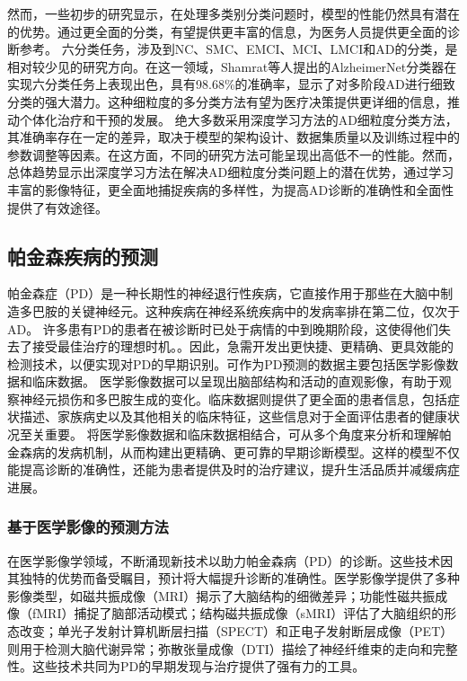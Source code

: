 然而，一些初步的研究显示，在处理多类别分类问题时，模型的性能仍然具有潜在的优势。通过更全面的分类，有望提供更丰富的信息，为医务人员提供更全面的诊断参考。
六分类任务，涉及到NC、SMC、EMCI、MCI、LMCI和AD的分类，是相对较少见的研究方向。在这一领域，Shamrat等人\cite{shamrat2023alzheimernet}提出的AlzheimerNet分类器在实现六分类任务上表现出色，具有98.68\%的准确率，显示了对多阶段AD进行细致分类的强大潜力。这种细粒度的多分类方法有望为医疗决策提供更详细的信息，推动个体化治疗和干预的发展。
绝大多数采用深度学习方法的AD细粒度分类方法，其准确率存在一定的差异，取决于模型的架构设计、数据集质量以及训练过程中的参数调整等因素。在这方面，不同的研究方法可能呈现出高低不一的性能。然而，总体趋势显示出深度学习方法在解决AD细粒度分类问题上的潜在优势，通过学习丰富的影像特征，更全面地捕捉疾病的多样性，为提高AD诊断的准确性和全面性提供了有效途径。


\subsection{帕金森疾病的预测}
帕金森症（PD）是一种长期性的神经退行性疾病，它直接作用于那些在大脑中制造多巴胺的关键神经元。这种疾病在神经系统疾病中的发病率排在第二位，仅次于AD\cite{prusiner2001neurodegenerative,leroy1998deletions}。
许多患有PD的患者在被诊断时已处于病情的中到晚期阶段，这使得他们失去了接受最佳治疗的理想时机。\cite{de2019prognosis,papagno2018cognitive}。因此，急需开发出更快捷、更精确、更具效能的检测技术，以便实现对PD的早期识别\cite{jyWen}。可作为PD预测的数据主要包括医学影像数据和临床数据。
医学影像数据可以呈现出脑部结构和活动的直观影像，有助于观察神经元损伤和多巴胺生成的变化。临床数据则提供了更全面的患者信息，包括症状描述、家族病史以及其他相关的临床特征，这些信息对于全面评估患者的健康状况至关重要。
将医学影像数据和临床数据相结合，可从多个角度来分析和理解帕金森病的发病机制，从而构建出更精确、更可靠的早期诊断模型。这样的模型不仅能提高诊断的准确性，还能为患者提供及时的治疗建议，提升生活品质并减缓病症进展。

\subsubsection{基于医学影像的预测方法}
在医学影像学领域，不断涌现新技术以助力帕金森病（PD）的诊断。这些技术因其独特的优势而备受瞩目，预计将大幅提升诊断的准确性。医学影像学提供了多种影像类型，如磁共振成像（MRI）揭示了大脑结构的细微差异；功能性磁共振成像（fMRI）捕捉了脑部活动模式；结构磁共振成像（sMRI）评估了大脑组织的形态改变；单光子发射计算机断层扫描（SPECT）和正电子发射断层成像（PET）则用于检测大脑代谢异常；弥散张量成像（DTI）描绘了神经纤维束的走向和完整性。这些技术共同为PD的早期发现与治疗提供了强有力的工具。


